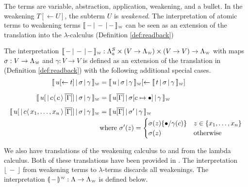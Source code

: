 \documentclass[a4paper,UKenglish,cleveref, autoref]{lipics-v2019}
\newcommand{\FALC}{\Lambda^{S}_{a}}
\newcommand{\WEAK}{\Lambda_{\weaksymbol}}
\newcommand{\set}[1]{ \{ #1 \} }
\newcommand{\share}[3]{#1 [#2 \leftarrow #3]}
\newcommand{\dist}[5]{#1 [ #2 \, \vert \, \fakedist{#4}{#5} \, #3 ]}
\newcommand{\fakedist}[2]{#1 \langle \, #2 \, \rangle}
\newcommand{\sub}[3]{#1 \{ #2 / #3 \}}
\newcommand{\weaksymbol}{\mbox{\tiny $\mathcal{W}$}}
\newcommand{\readweakwmap}[3]{\llbracket \, #1 \, \vert \, #2 \, \vert \, #3  \, \rrbracket_{\weaksymbol} }
\newcommand{\compweak}[1]{\llparenthesis \, #1 \, \rrparenthesis^{\weaksymbol}}
\newcommand{\readbackweak}[1]{\lfloor \, #1 \, \rfloor}
\begin{document}
The terms are variable, abstraction, application, weakening, and a bullet. In the weakening $\share{T}{}{U}$, the subterm $U$ is \emph{weakened}. The interpretation of atomic terms to weakening terms $\readweakwmap{-}{-}{-}$ can be seen as an extension of the translation into the $\lambda$-calculus (Definition \ref{def:readback})

\begin{definition}
\label{def:transfalcweak}
	The interpretation $\readweakwmap{-}{-}{-} : \FALC \times (V \rightarrow \WEAK) \times (V \rightarrow V) \rightarrow \WEAK$ with maps $\sigma : V \rightarrow \WEAK$ and $\gamma : V \rightarrow V$ is defined as an extension of the translation in (Definition \ref{def:readback}) with the following additional special cases.
	\begin{align*}
		\readweakwmap{\share{u}{}{t}}{\sigma}{\gamma} &= \share{\readweakwmap{u}{\sigma}{\gamma}}{}{\readweakwmap{t}{\sigma}{\gamma}} \\[0.2cm]
		\readweakwmap{\dist{u}{}{\overline{[\Gamma]}}{c}{c}}{\sigma}{\gamma} &= \readweakwmap{u \overline{[\Gamma]}}{\sigma[c \mapsto \bullet]}{\gamma} \\[0.2cm]
		\readweakwmap{\dist{u}{}{\overline{[\Gamma]}}{c}{x_{1}, \dots, x_{n}}}{\sigma}{\gamma} &= \readweakwmap{u \overline{[\Gamma]}}{\sigma'}{\gamma} \\
		& \text{where } \sigma'(z) = \begin{cases} \sigma(z) \sub{}{\bullet}{\gamma(c)} & z \in \set{x_{1}, \dots, x_{n}} \\ \sigma(z) & \text{otherwise} \end{cases} \\
	\end{align*}
\end{definition}

\noindent We also have translations of the weakening calculus to and from the lambda calculus. Both of these translations have been provided in  \cite{gundersen2013atomic}. The interpretation $\readbackweak{-}$ from weakening terms to $\lambda$-terms discards all weakenings. The interpretation $\compweak{-} : \Lambda \rightarrow \WEAK$ is defined below.
\end{document}
